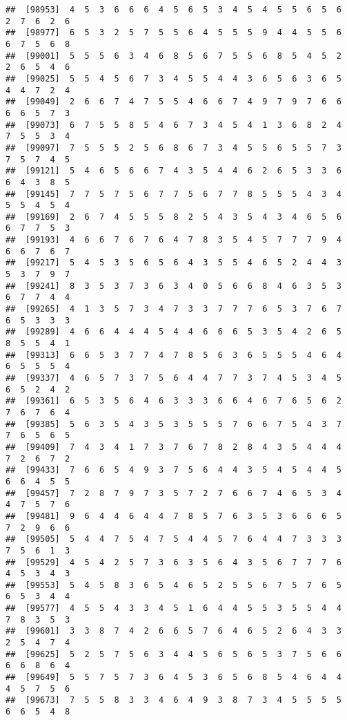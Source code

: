 \documentclass[
]{book}
\begin{document}
\begin{verbatim}
##  [98953]  4  5  3  6  6  6  4  5  6  5  3  4  5  4  5  5  6  5  6  2  7  6  2  6
##  [98977]  6  5  3  2  5  7  5  5  6  4  5  5  5  9  4  4  5  5  6  6  7  5  6  8
##  [99001]  5  5  5  6  3  4  6  8  5  6  7  5  5  6  8  5  4  5  2  2  6  5  4  6
##  [99025]  5  5  4  5  6  7  3  4  5  5  4  4  3  6  5  6  3  6  5  4  4  7  2  4
##  [99049]  2  6  6  7  4  7  5  5  4  6  6  7  4  9  7  9  7  6  6  6  6  5  7  3
##  [99073]  6  7  5  5  8  5  4  6  7  3  4  5  4  1  3  6  8  2  4  7  5  5  3  4
##  [99097]  7  5  5  5  2  5  6  8  6  7  3  4  5  5  6  5  5  7  3  7  5  7  4  5
##  [99121]  5  4  6  5  6  6  7  4  3  5  4  4  6  2  6  5  3  3  6  6  4  3  8  5
##  [99145]  7  7  5  7  5  6  7  7  5  6  7  7  8  5  5  5  4  3  4  5  5  4  5  4
##  [99169]  2  6  7  4  5  5  5  8  2  5  4  3  5  4  3  4  6  5  6  6  7  7  5  3
##  [99193]  4  6  6  7  6  7  6  4  7  8  3  5  4  5  7  7  7  9  4  6  6  7  6  7
##  [99217]  5  4  5  3  5  6  5  6  4  3  5  5  4  6  5  2  4  4  3  5  3  7  9  7
##  [99241]  8  3  5  3  7  3  6  3  4  0  5  6  6  8  4  6  3  5  3  6  7  7  4  4
##  [99265]  4  1  3  5  7  3  4  7  3  3  7  7  7  6  5  3  7  6  7  6  5  3  3  3
##  [99289]  4  6  6  4  4  4  5  4  4  6  6  6  5  3  5  4  2  6  5  8  5  5  4  1
##  [99313]  6  6  5  3  7  7  4  7  8  5  6  3  6  5  5  5  4  6  4  6  5  5  5  4
##  [99337]  4  6  5  7  3  7  5  6  4  4  7  7  3  7  4  5  3  4  5  6  5  2  4  2
##  [99361]  6  5  3  5  6  4  6  3  3  3  6  6  4  6  7  6  5  6  2  7  6  7  6  4
##  [99385]  5  6  3  5  4  3  5  3  5  5  5  7  6  6  7  5  4  3  7  7  6  5  6  5
##  [99409]  7  4  3  4  1  7  3  7  6  7  8  2  8  4  3  5  4  4  4  7  2  6  7  2
##  [99433]  7  6  6  5  4  9  3  7  5  6  4  4  3  5  4  5  4  4  5  6  6  4  5  5
##  [99457]  7  2  8  7  9  7  3  5  7  2  7  6  6  7  4  6  5  3  4  4  7  5  7  6
##  [99481]  9  6  4  4  6  4  4  7  8  5  7  6  3  5  3  6  6  6  5  7  2  9  6  6
##  [99505]  5  4  4  7  5  4  7  5  4  4  5  7  6  4  4  7  3  3  3  7  5  6  1  3
##  [99529]  4  5  4  2  5  7  3  6  3  5  6  4  3  5  6  7  7  7  6  4  5  3  4  3
##  [99553]  5  4  5  8  3  6  5  4  6  5  2  5  5  6  7  5  7  6  5  6  5  3  4  4
##  [99577]  4  5  5  4  3  3  4  5  1  6  4  4  5  5  3  5  5  4  4  7  8  3  5  3
##  [99601]  3  3  8  7  4  2  6  6  5  7  6  4  6  5  2  6  4  3  3  2  5  4  7  4
##  [99625]  5  2  5  7  5  6  3  4  4  5  6  5  6  5  3  7  5  6  6  6  6  8  6  4
##  [99649]  5  5  7  5  7  3  6  4  5  3  6  5  6  8  5  4  6  4  4  4  5  7  5  6
##  [99673]  7  5  5  8  3  3  4  6  4  9  3  8  7  3  4  5  5  5  5  6  6  5  4  8

\end{verbatim}
\end{document}
